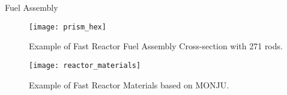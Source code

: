 \begin{frame}{Fuel Assembly}
  \begin{figure}
    \centering
    \texttt{[image: prism\_hex]}
    \caption{Example of Fast Reactor Fuel Assembly Cross-section with 271 rods.}
    \label{fig:prism_hex}
  \end{figure}
\end{frame}

\begin{frame}
  \begin{figure}
    \centering
    \texttt{[image: reactor\_materials]}
    \caption{Example of Fast Reactor Materials based on MONJU.}
    \label{fig:reactor_materials}
  \end{figure}
\end{frame}
